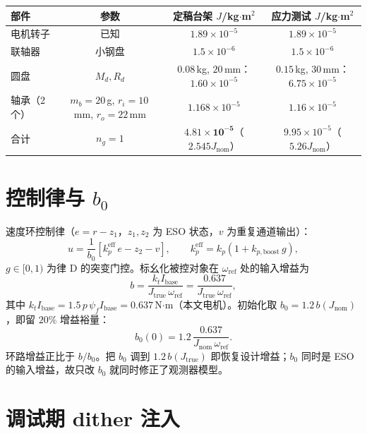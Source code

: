 \documentclass[11pt,a4paper]{article}
\newcommand{\Jnom}{J_{\mathrm{nom}}}
\newcommand{\Jtrue}{J_{\mathrm{true}}}
\newcommand{\bzero}{b_0}
\newcommand{\wref}{\omega_{\mathrm{ref}}}
\begin{document}
\begin{center}\footnotesize
\begin{tabular}{@{}lccc@{}}
\toprule
部件 & 参数 & 定稿台架 $J$/kg$\cdot$m$^2$ & 应力测试 $J$/kg$\cdot$m$^2$\\
\midrule
电机转子 & 已知 & $1.89\times10^{-5}$ & $1.89\times10^{-5}$\\
联轴器 & 小钢盘 & $1.5\times10^{-6}$ & $1.5\times10^{-6}$\\
圆盘 & $M_d,R_d$ & $0.08$\,kg, $20$\,mm：$1.60\times10^{-5}$ & $0.15$\,kg, $30$\,mm：$6.75\times10^{-5}$\\
轴承（2 个） & $m_b=20$\,g, $r_i=10$\,mm, $r_o=22$\,mm & $1.168\times10^{-5}$ & $1.16\times10^{-5}$\\
\midrule
合计 & $n_g=1$ & $\mathbf{4.81\times10^{-5}}$（$2.545\Jnom$） & $9.95\times10^{-5}$（$5.26\Jnom$）\\
\bottomrule
\end{tabular}
\end{center}

\section{控制律与 $b_0$}

速度环控制律（$e=r-z_1$，$z_1,z_2$ 为 ESO 状态，$v$ 为重复通道输出）：
\begin{equation}
u=\frac{1}{\bzero}\left[k_p^{\mathrm{eff}}\,e-z_2-v\right],\qquad
k_p^{\mathrm{eff}}=k_p\left(1+k_{p,\mathrm{boost}}\,g\right),
\label{eq:law}
\end{equation}
$g\in[0,1)$ 为律 D 的突变门控。标幺化被控对象在 $\wref$ 处的输入增益为
\begin{equation}
b=\frac{k_t I_{\mathrm{base}}}{\Jtrue\,\wref}=\frac{0.637}{\Jtrue\,\wref},
\label{eq:bplant}
\end{equation}
其中 $k_tI_{\mathrm{base}}=1.5\,p\,\psi_f I_{\mathrm{base}}=0.637$\,N$\cdot$m（本文电机）。初始化取 $\bzero=1.2\,b(\Jnom)$，即留 $20\%$ 增益裕量：
\begin{equation}
\bzero(0)=1.2\,\frac{0.637}{\Jnom\,\wref}.
\label{eq:b0init}
\end{equation}
环路增益正比于 $b/b_0$。把 $b_0$ 调到 $1.2\,b(\Jtrue)$ 即恢复设计增益；$b_0$ 同时是 ESO 的输入增益，故只改 $b_0$ 就同时修正了观测器模型。

\section{调试期 dither 注入}
\end{document}
